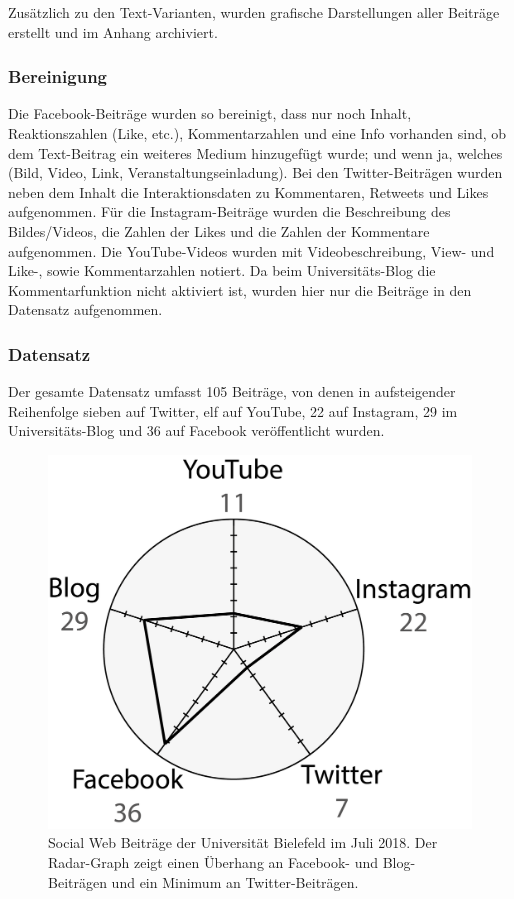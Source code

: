 Zusätzlich zu den Text-Varianten, wurden grafische Darstellungen aller Beiträge erstellt und im Anhang archiviert.

\subsubsection{Bereinigung}
\label{sec:Datenbereinigung}

Die Facebook-Beiträge wurden so bereinigt, dass nur noch Inhalt, Reaktionszahlen (Like, etc.), Kommentarzahlen und eine Info vorhanden sind, ob dem Text-Beitrag ein weiteres Medium hinzugefügt wurde; und wenn ja, welches (Bild, Video, Link, Veranstaltungseinladung). Bei den Twitter-Beiträgen wurden neben dem Inhalt die Interaktionsdaten zu Kommentaren, Retweets und Likes aufgenommen. Für die Instagram-Beiträge wurden die Beschreibung des Bildes/Videos, die Zahlen der Likes und die Zahlen der Kommentare aufgenommen. Die YouTube-Videos wurden mit Videobeschreibung, View- und Like-, sowie Kommentarzahlen notiert. Da beim Universitäts-Blog die Kommentarfunktion nicht aktiviert ist, wurden hier nur die Beiträge in den Datensatz aufgenommen.

\subsubsection{Datensatz}
\label{sec:Datensatz}

Der gesamte Datensatz umfasst 105 Beiträge, von denen in aufsteigender Reihenfolge sieben auf Twitter, elf auf YouTube, 22 auf Instagram, 29 im Universitäts-Blog und 36 auf Facebook veröffentlicht wurden.

\begin{figure}[h]
    \centering
    \includegraphics[width=.6\textwidth]{img/posts/posts_gesamt.png}
    \caption{Social Web Beiträge der Universität Bielefeld im Juli 2018. Der Radar-Graph zeigt einen Überhang an Facebook- und Blog-Beiträgen und ein Minimum an Twitter-Beiträgen.}
    \label{fig:socialmediaposts}
\end{figure}  

